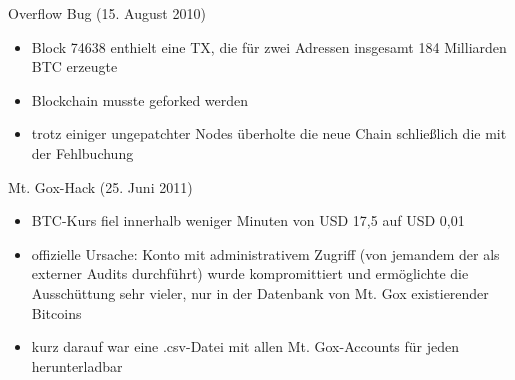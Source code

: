 \documentclass[handout]{beamer} \usepackage[german]{babel}
\begin{document}
%

\begin{frame}
	{Overflow Bug (15. August 2010)}
	\begin{itemize}
		\item Block 74638 enthielt eine TX, die für zwei Adressen insgesamt 184
			Milliarden BTC erzeugte
		\item Blockchain musste geforked werden
		\item trotz einiger ungepatchter Nodes überholte die neue Chain
			schließlich die mit der Fehlbuchung
	\end{itemize}
\end{frame}

\begin{frame}
	{Mt. Gox-Hack (25. Juni 2011)}
	\begin{itemize}
		\item BTC-Kurs fiel innerhalb weniger Minuten von USD 17,5 auf USD 0,01
		\item offizielle Ursache: Konto mit administrativem Zugriff (von jemandem
			der als externer Audits durchführt) wurde kompromittiert und
			ermöglichte die Ausschüttung sehr vieler, nur in der Datenbank von Mt.
			Gox existierender Bitcoins
		\item kurz darauf war eine .csv-Datei mit allen Mt. Gox-Accounts für
			jeden herunterladbar
	\end{itemize}
\end{frame}
\end{document}
